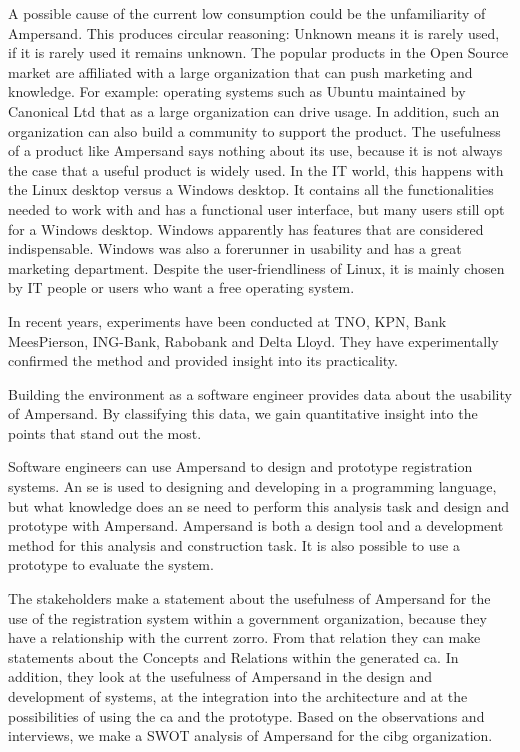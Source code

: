 A possible cause of the current low consumption could be the unfamiliarity of Ampersand.
This produces circular reasoning:
Unknown means it is rarely used, if it is rarely used it remains unknown.
The popular products in the Open Source market are affiliated with a large organization that can push marketing and knowledge.
For example: operating systems such as Ubuntu maintained by Canonical Ltd that as a large organization can drive usage.
In addition, such an organization can also build a community to support the product.
The usefulness of a product like Ampersand says nothing about its use, because it is not always the case that a useful product is widely used.
In the IT world, this happens with the Linux desktop versus a Windows desktop.
It contains all the functionalities needed to work with and has a functional user interface, but many users still opt for a Windows desktop.
Windows apparently has features that are considered indispensable.
Windows was also a forerunner in usability and has a great marketing department.
Despite the user-friendliness of Linux, it is mainly chosen by IT people or users who want a free operating system.

In recent years, experiments have been conducted at TNO, KPN, Bank MeesPierson, ING-Bank, Rabobank and Delta Lloyd.
They have experimentally confirmed the method and provided insight into its practicality.

Building the environment as a software engineer provides data about the usability of Ampersand.
By classifying this data, we gain quantitative insight into the points that stand out the most.

Software engineers can use Ampersand to design and prototype registration systems.
An \acrlong{se} is used to designing and developing in a programming language, but what knowledge does an \acrlong{se} need to perform this analysis task and design and prototype with Ampersand.
Ampersand is both a design tool and a development method for this analysis and construction task.
It is also possible to use a prototype to evaluate the system.

The stakeholders make a statement about the usefulness of Ampersand for the use of the registration system within a government organization, because they have a relationship with the current \acrshort{zorro}.
From that relation they can make statements about the Concepts and Relations within the generated \acrlong{ca}.
In addition, they look at the usefulness of Ampersand in the design and development of systems, at the integration into the architecture and at the possibilities of using the \acrlong{ca} and the prototype.
Based on the observations and interviews, we make a SWOT analysis of Ampersand for the \acrshort{cibg} organization.

